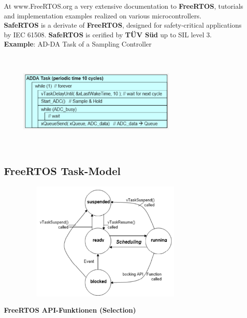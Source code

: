 At www.FreeRTOS.org a very extensive documentation to \textbf{FreeRTOS}, tutorials and implementation examples realized on various microcontrollers.\\

\textbf{SafeRTOS} is a derivate of \textbf{FreeRTOS}, designed for safety-critical applications  by IEC 61508. \textbf{SafeRTOS} is cerified by \textbf{T\"{U}V S\"{u}d} up to SIL level 3.\\

\textbf{Example}: AD-DA Task of a Sampling Controller\\

 	\begin{figure}[h]
    \centering
    \includegraphics[width=8cm, height=5cm]{Images/image131.png}
    \label{fig:Fig 81}
    \end{figure}
\newpage
\subsection{ FreeRTOS Task-Model}

 	\begin{figure}[h]
    \centering
    \includegraphics[width=9cm, height=6cm]{Images/image132.png}
    \label{fig:Fig 82}
    \end{figure}

{\rot\bf FreeRTOS API-Funktionen (Selection)}\\

